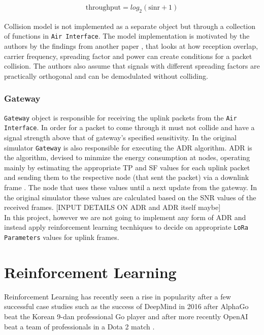 \begin{align}
    \text{throughput} = \text{$log_{2}$}(\text{sinr} + 1)
\end{align}

Collision model is not implemented as a separate object but through a collection of functions in \texttt{Air Interface}. The model implementation is motivated by the authors \cite{simulator} by the findings from another paper \cite{collision_conditions}, that looks at how reception overlap, carrier frequency, spreading factor and power can create conditions for a packet collision. The authors \cite{simulator} also assume that signals with different spreading factors are practically orthogonal and can be demodulated without colliding.

\subsection{Gateway}

\texttt{Gateway} object is responsible for receiving 
the uplink packets from the \texttt{Air Interface}. In order for a packet to come through it must not collide and have  a signal strength above that of gateway's specified sensitivity. In the original simulator \cite{simulator} \texttt{Gateway} is also responsible for executing the ADR algorithm. ADR is the algorithm, devised to minmize the energy consumption at nodes, operating mainly by estimating the appropriate TP and SF values for each uplink packet and sending them to the respective node (that sent the packet) via a downlink frame \cite{simulator}. The node that uses these values until a next update from the gateway. In the original simulator these values are calculated based on the SNR values of the received frames. 
[INPUT DETAILS ON ADR and ADR itself maybe] \\

In this project, however we are not going to implement any form of ADR and instead apply reinforcement learning tecnhiques to 
decide on appropriate \texttt{LoRa Parameters} values for uplink frames.



\chapter{Reinforcement Learning} 

Reinforcement Learning has recently seen a rise in popularity after a few successful case studies such as the success of DeepMind in 2016 after AlphaGo beat the Korean 9-dan professional Go player \cite{alpha_go_lee_sedol} and after more recently OpenAI beat a team of professionals in a Dota 2 match \cite{dota}.\\

